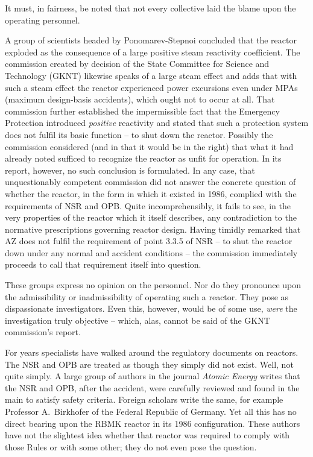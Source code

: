 \documentclass[openright]{bookest}
\begin{document}
It must, in fairness, be noted that not every collective laid the blame upon the operating personnel.


A group of scientists headed by Ponomarev-Stepnoi concluded that the reactor exploded as the consequence of a large positive steam reactivity coefficient. The commission created by decision of the State Committee for Science and Technology (GKNT) likewise speaks of a large steam effect and adds that with such a steam effect the reactor experienced power excursions even under MPAs (maximum design-basis accidents), which ought not to occur at all. That commission further established the impermissible fact that the Emergency Protection introduced \textit{positive} reactivity and stated that such a protection system does not fulfil its basic function -- to shut down the reactor. Possibly the commission considered (and in that it would be in the right) that what it had already noted sufficed to recognize the reactor as unfit for operation. In its report, however, no such conclusion is formulated. In any case, that unquestionably competent commission did not answer the concrete question of whether the reactor, in the form in which it existed in 1986, complied with the requirements of NSR and OPB. Quite incomprehensibly, it fails to see, in the very properties of the reactor which it itself describes, any contradiction to the normative prescriptions governing reactor design. Having timidly remarked that AZ does not fulfil the requirement of point 3.3.5 of NSR -- to shut the reactor down under any normal and accident conditions -- the commission immediately proceeds to call that requirement itself into question.

These groups express no opinion on the personnel. Nor do they pronounce upon the admissibility or inadmissibility of operating such a reactor. They pose as dispassionate investigators. Even this, however, would be of some use, \textit{were} the investigation truly objective -- which, alas, cannot be said of the GKNT commission's report.


For years specialists have walked around the regulatory documents on reactors. The NSR and OPB are treated as though they simply did not exist. Well, not quite simply. A large group of authors in the journal \textit{Atomic Energy} writes that the NSR and OPB, after the accident, were carefully reviewed and found in the main to satisfy safety criteria. Foreign scholars write the same, for example Professor A.~Birkhofer of the Federal Republic of Germany. Yet all this has no direct bearing upon the RBMK reactor in its 1986 configuration. These authors have not the slightest idea whether that reactor was required to comply with those Rules or with some other; they do not even pose the question.
\end{document}
